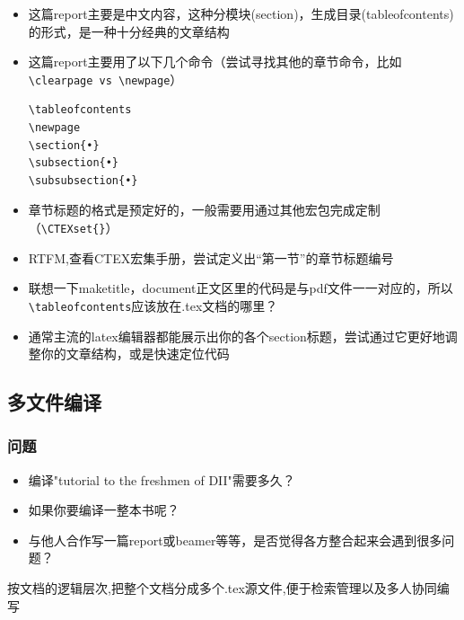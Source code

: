 	\begin{frame}[fragile]
		\begin{itemize}
			\item 这篇report主要是中文内容，这种分模块(section)，生成目录(tableofcontents)的形式，是一种十分经典的文章结构
			\item 这篇report主要用了以下几个命令（尝试寻找其他的章节命令，比如\verb|\clearpage vs \newpage|）
\begin{lstlisting}
\tableofcontents
\newpage
\section{•}
\subsection{•}
\subsubsection{•}
\end{lstlisting}
			\item 章节标题的格式是预定好的，一般需要用通过其他宏包完成定制（\verb|\CTEXset{}|）
			\item RTFM,查看CTEX宏集手册，尝试定义出“第一节”的章节标题编号
			\item 联想一下maketitle，document正文区里的代码是与pdf文件一一对应的，所以\verb|\tableofcontents|应该放在.tex文档的哪里？
			\item 通常主流的latex编辑器都能展示出你的各个section标题，尝试通过它更好地调整你的文章结构，或是快速定位代码
		\end{itemize}
	\end{frame}
	

\subsection{多文件编译}
	\begin{frame}
	    \frametitle{问题}
		\begin{itemize}
			\item 编译"tutorial to the freshmen of DII"需要多久？\pause
			\item 如果你要编译一整本书呢？\pause
			\item 与他人合作写一篇report或beamer等等，是否觉得各方整合起来会遇到很多问题？
		\end{itemize}\pause
	按文档的逻辑层次,把整个文档分成多个.tex源文件,便于检索管理以及多人协同编写
	\end{frame}
	
